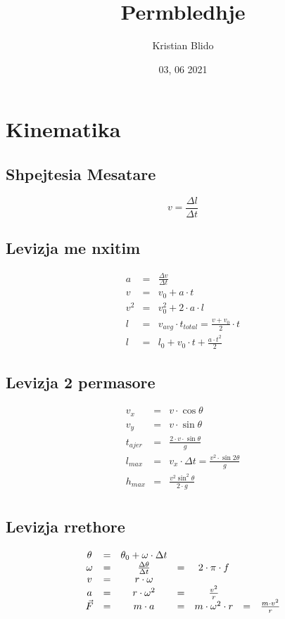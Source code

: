 \documentclass[a4paper, twocolumn]{article}
\title{Permbledhje}
\author{Kristian Blido}
\date{03, 06 2021}
\begin{document}
\tableofcontents
\maketitle
\section{Kinematika}
\subsection{Shpejtesia Mesatare}
\[v=\frac{\Delta l}{\Delta t}\]
\subsection{Levizja me nxitim}
\begin{eqnarray*}
a & =&\frac{\Delta v}{\Delta t}\\
v & =& v_0 + a \cdot t\\
v^2 & =& v_{0}^{2}+2\cdot a \cdot l \\
l & =& v_{avg} \cdot t_{total} = \frac{v + v_0}{2} \cdot t \\
l & =& l_0 + v_0 \cdot t + \frac{a\cdot t^2}{2}
\end{eqnarray*}
\subsection{Levizja 2 permasore}
\begin{eqnarray*}
	v_x &=& v \cdot \cos\theta \\
	v_y &=& v \cdot \sin\theta \\
	t_{ajer} &=& \frac{2 \cdot v \cdot \sin \theta }{g}\\
	l_{max} &=& v_x \cdot \Delta t = \frac{v^2 \cdot \sin 2\theta}{g} \\
	h_{max} &=& \frac{v^2 \sin^2 \theta}{2\cdot g}\\
\end{eqnarray*}
\subsection{Levizja rrethore}
\[
\begin{array}{c c c c c c c}
	\theta &=& \theta_0 + \omega \cdot \Delta t &&&&\\
	\omega &=& \frac{\Delta \theta}{\Delta t} &=& 2\cdot \pi \cdot f&&\\
	v &=& r \cdot \omega&&&&\\
	a &=& r \cdot \omega^2 &=& \frac{v^2}{r}&&\\
	\vec{F} &=& m\cdot a &=& m\cdot \omega^2\cdot r &=& \frac{m \cdot v^2}{r}\\
\end{array}
\]
\end{document}
